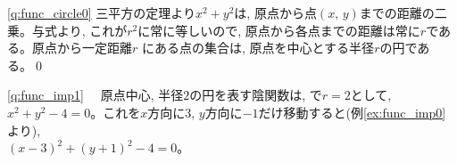 \ref{q:func_circle0} 三平方の定理より$x^{2} + y^{2}$は, 原点から点$(x,\,y)$までの距離の二乗。与式より, 
これが$r^2$に常に等しいので, 原点から各点までの距離は常に$r$である。原点から一定距離$r$
にある点の集合は, 原点を中心とする半径$r$の円である。\qed
\mv

\ref{q:func_imp1}　
原点中心, 半径$2$の円を表す陰関数は, で$r=2$として, 
$x^2+y^2-4=0$。これを$x$方向に3, $y$方向に$-1$だけ移動すると(例\ref{ex:func_imp0}より), \\
$(x-3)^2+(y+1)^2-4=0$。\mv

